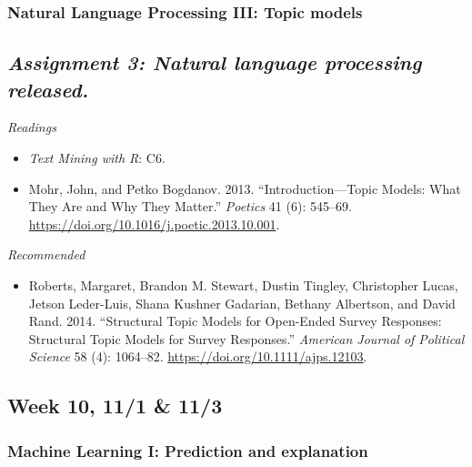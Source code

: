 \documentclass[
  10pt,
]{article}
\providecommand{\tightlist}{%
  \setlength{\itemsep}{0pt}\setlength{\parskip}{0pt}}
\begin{document}
\hypertarget{natural-language-processing-iii-topic-models}{%
\subsubsection{Natural Language Processing III: Topic
models}\label{natural-language-processing-iii-topic-models}}

\hypertarget{assignment-3-natural-language-processing-released.}{%
\subsection{\texorpdfstring{\emph{Assignment 3: Natural language
processing
released.}}{Assignment 3: Natural language processing released.}}\label{assignment-3-natural-language-processing-released.}}

\emph{Readings}

\begin{itemize}
\tightlist
\item
  \emph{Text Mining with R}: C6.
\item
  Mohr, John, and Petko Bogdanov. 2013. ``Introduction---Topic Models:
  What They Are and Why They Matter.'' \emph{Poetics} 41 (6): 545--69.
  \url{https://doi.org/10.1016/j.poetic.2013.10.001}.
\end{itemize}

\emph{Recommended}

\begin{itemize}
\tightlist
\item
  Roberts, Margaret, Brandon M. Stewart, Dustin Tingley, Christopher
  Lucas, Jetson Leder-Luis, Shana Kushner Gadarian, Bethany Albertson,
  and David Rand. 2014. ``Structural Topic Models for Open-Ended Survey
  Responses: Structural Topic Models for Survey Responses.''
  \emph{American Journal of Political Science} 58 (4): 1064--82.
  \url{https://doi.org/10.1111/ajps.12103}.
\end{itemize}

\hypertarget{week-10-111-113}{%
\subsection{Week 10, 11/1 \& 11/3}\label{week-10-111-113}}

\hypertarget{machine-learning-i-prediction-and-explanation}{%
\subsubsection{Machine Learning I: Prediction and
explanation}\label{machine-learning-i-prediction-and-explanation}}
\end{document}
